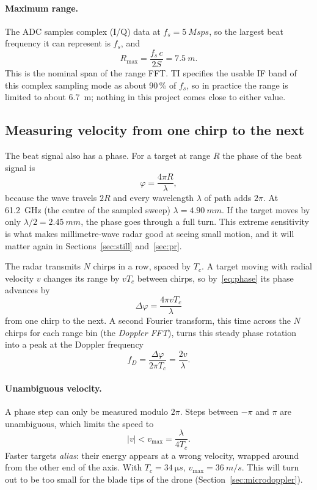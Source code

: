 \documentclass[11pt,a4paper]{article}
\newcommand{\vmax}{v_{\max}}
\begin{document}
\paragraph{Maximum range.} The ADC samples complex (I/Q) data at $f_s = \SI{5}{Msps}$, so the largest beat frequency it can represent is $f_s$, and
\begin{equation}
R_{\max} = \frac{f_s\,c}{2S} = \SI{7.5}{m}.
\end{equation}
This is the nominal span of the range FFT. TI specifies the usable IF band of this complex sampling mode as about 90\,\% of $f_s$, so in practice the range is limited to about \SI{6.7}{m}; nothing in this project comes close to either value.

\subsection{Measuring velocity from one chirp to the next}

The beat signal also has a phase. For a target at range $R$ the phase of the beat signal is
\begin{equation}
\varphi = \frac{4\pi R}{\lambda},
\label{eq:phase}
\end{equation}
because the wave travels $2R$ and every wavelength $\lambda$ of path adds $2\pi$. At \SI{61.2}{GHz} (the centre of the sampled sweep) $\lambda = \SI{4.90}{mm}$. If the target moves by only $\lambda/2 = \SI{2.45}{mm}$, the phase goes through a full turn. This extreme sensitivity is what makes millimetre-wave radar good at seeing small motion, and it will matter again in Sections~\ref{sec:still} and~\ref{sec:pr}.

The radar transmits $N$ chirps in a row, spaced by $T_c$. A target moving with radial velocity $v$ changes its range by $v T_c$ between chirps, so by~\eqref{eq:phase} its phase advances by
\begin{equation}
\Delta\varphi = \frac{4\pi v T_c}{\lambda}
\end{equation}
from one chirp to the next. A second Fourier transform, this time across the $N$ chirps for each range bin (the \emph{Doppler FFT}), turns this steady phase rotation into a peak at the Doppler frequency
\begin{equation}
f_D = \frac{\Delta\varphi}{2\pi T_c} = \frac{2v}{\lambda}.
\end{equation}

\paragraph{Unambiguous velocity.} A phase step can only be measured modulo $2\pi$. Steps between $-\pi$ and $\pi$ are unambiguous, which limits the speed to
\begin{equation}
|v| < \vmax = \frac{\lambda}{4 T_c}.
\end{equation}
Faster targets \emph{alias}: their energy appears at a wrong velocity, wrapped around from the other end of the axis. With $T_c = \SI{34}{\micro s}$, $\vmax = \SI{36}{m/s}$. This will turn out to be too small for the blade tips of the drone (Section~\ref{sec:microdoppler}).
\end{document}
